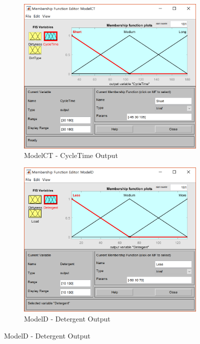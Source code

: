 \documentclass[11pt]{article}
\begin{document}
\begin{enumerate}[label=(\alph*)]
  \begin{figure}[ht!]
  \centering
  \begin{subfigure}{.5\textwidth}
    \centering
    \includegraphics[width=.9\linewidth]{res/image1_cycletime}
    \caption{ModelCT - CycleTime Output}
    \label{fig:sub1}
  \end{subfigure}%
  \begin{subfigure}{.5\textwidth}
    \centering
    \includegraphics[width=.9\linewidth]{res/image2_detergent}
    \caption{ModelD - Detergent Output}
    \label{fig:sub2}
  \end{subfigure}
  \end{figure}

  \pagebreak


\end{enumerate}
\end{document}
